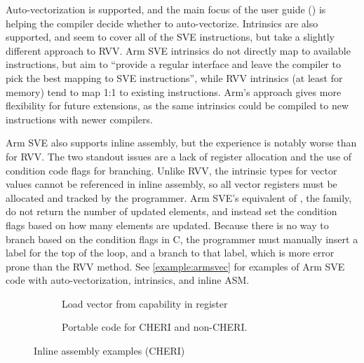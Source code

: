 \documentclass[../thesis]{subfiles}
\begin{document}
Auto-vectorization is supported, and the main focus of the user guide (\cite{armltdArmCompilerScalable2019}) is helping the compiler decide whether to auto-vectorize.
Intrinsics are also supported, and seem to cover all of the SVE instructions, but take a slightly different approach to RVV.
Arm SVE intrinsics do not directly map to available instructions, but aim to \enquote{provide a regular interface and leave the compiler to pick the best mapping to SVE instructions}, while RVV intrinsics (at least for memory) tend to map 1:1 to existing instructions.
Arm's approach gives more flexibility for future extensions, as the same intrinsics could be compiled to new instructions with newer compilers.

Arm SVE also supports inline assembly, but the experience is notably worse than for RVV.
The two standout issues are a lack of register allocation and the use of condition code flags for branching.
Unlike RVV, the intrinsic types for vector values cannot be referenced in inline assembly\cite{stephensARMScalableVector2017}, so all vector registers must be allocated and tracked by the programmer.
Arm SVE's equivalent of , the  family\cite{armltdARMLanguageExtensions2020}, do not return the number of updated elements, and instead set the condition flags based on how many elements are updated.
Because there is no way to branch based on the condition flags in C, the programmer must manually insert a label for the top of the loop, and a branch to that label, which is more error prone than the RVV method.
See \cref{example:armsvec} for examples of Arm SVE code with auto-vectorization, intrinsics, and inline ASM.

\begin{figure}
    \centering
    \begin{subfigure}[t]{0.45\textwidth}
        \caption{Load vector from capability in register}\label{subfig:inline_asm_vector_cap_reg}
    \end{subfigure}\hfill{}
    \begin{subfigure}[t]{0.54\textwidth}
        \centering
        \caption{Portable code for CHERI and non-CHERI.}\label{subfig:inline_asm_vector_portable}
    \end{subfigure}
    \parnotes{}
    \caption{Inline assembly examples (CHERI)}\label{fig:inlineasmcheri}
\end{figure}
\end{document}
